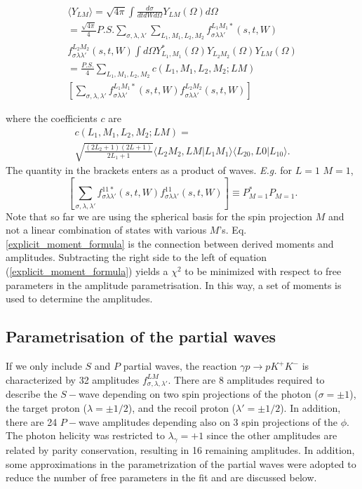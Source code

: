 \documentclass[twocolumn,superscriptaddress,prd]{revtex4}
\begin{document}
\begin{eqnarray}
\langle Y_{LM}\rangle = \sqrt{4\pi} \int \frac{d\sigma}{d t d W d \Omega} Y_{LM}(\Omega) d\Omega\\ \nonumber
= \frac{\sqrt{4\pi}}{4} P.S. \sum_{\sigma,\lambda,\lambda'} \sum_{L_1,M_1,L_2,M_2} f^{L_1M_1 *}_{\sigma\lambda\lambda'}(s,t,W)\\ \nonumber
 f^{L_2M_2 }_{\sigma\lambda\lambda'}(s,t,W) \int d\Omega Y^*_{L_1,M_1}(\Omega) Y_{L_2M_2}(\Omega) Y_{LM}(\Omega) \\ \nonumber
=  \frac{P.S.}{4}\sum_{L_1,M_1,L_2,M_2} c(L_1,M_1,L_2,M_2;LM)\\ \left[ \sum_{\sigma,\lambda,\lambda'} f^{L_1M_1 *}_{\sigma\lambda\lambda'}(s,t,W) 
 f^{L_2M_2}_{\sigma\lambda\lambda'}(s,t,W)  \right] \nonumber
\label{explicit_moment_formula}
\end{eqnarray}


where the coefficients $c$ are 
\begin{eqnarray} 
c(L_1,M_1,L_2,M_2;LM) =\\ \nonumber
 \sqrt{\frac{(2L_2+1)(2L +1)}{2L_1+1}}\langle L_2 M_2, LM|L_1M_1\rangle \langle L_20,L0|L_10\rangle .
\end{eqnarray}
The quantity in the brackets enters as a product of waves. {\it E.g.} for $L=1$ $M=1$, 
   \begin{equation} 
    \left[ \sum_{\sigma,\lambda,\lambda'} f^{11 *}_{\sigma\lambda\lambda'}(s,t,W) 
 f^{11}_{\sigma\lambda\lambda'}(s,t,W)  \right]  \equiv P^*_{M=1} P_{M=1} .
 \end{equation} 
Note that so far we are using the spherical basis for the spin projection $M$ and not a linear combination of states with various $M$'s. Eq. \ref{explicit_moment_formula} is the connection between derived moments and amplitudes. Subtracting the right side to the left of equation (\ref{explicit_moment_formula}) yields a $\chi^2$ to be minimized with respect to free parameters in the amplitude parametrisation. In this way, a set of moments is used to determine the amplitudes.

\subsection{Parametrisation of the partial waves}\label{sec:amplitudes}
If we only include $S$ and $P$ partial waves, the reaction $\gamma p \rightarrow p  K^+ K^- $
is characterized by 32 amplitudes $f^{LM}_{\sigma,\lambda,\lambda'}$. There are 8 amplitudes required to describe the $S-$wave depending on two spin projections of the photon ($\sigma= \pm 1$), the target proton ($\lambda = \pm 1/2 $), and the recoil proton ($\lambda' = \pm 1/2$). In addition, there are 24 $P-$wave amplitudes depending also on 3 spin projections of the $\phi$. The photon helicity was  restricted to  $\lambda_\gamma  = +1$
since the other amplitudes are related by parity conservation, resulting in 16 remaining amplitudes.
In addition, some  approximations in the parametrization  of the partial 
waves were adopted to reduce the number of free parameters in the fit
and are discussed below.
\end{document}
